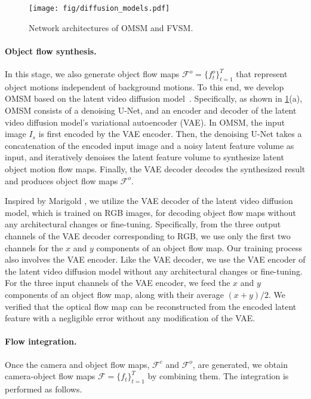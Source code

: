 \begin{figure}[t!]
\centering
\texttt{[image: fig/diffusion\_models.pdf]}
\vspace{-3mm}
\caption{
Network architectures of OMSM and FVSM.
}
\vspace{-4mm}
\label{fig:diffusion_models}
\end{figure}



\paragraph{Object flow synthesis.}
In this stage, we also generate object flow maps $\mathcal{F}^o=\{f_t^o\}_{t=1}^T$ that represent object motions independent of background motions.
To this end, we develop OMSM based on the latent video diffusion model~\cite{blattmann2023stable}.
Specifically, as shown in \cref{fig:diffusion_models}(a), OMSM consists of a denoising U-Net, and an encoder and decoder of the latent video diffusion model's variational autoencoder (VAE).
In OMSM, the input image $I_s$ is first encoded by the VAE encoder.
Then, the denoising U-Net takes a concatenation of the encoded input image and a noisy latent feature volume as input, and iteratively denoises the latent feature volume to synthesize latent object motion flow maps.
Finally, the VAE decoder decodes the synthesized result and produces object flow maps $\mathcal{F}^o$. 

Inspired by Marigold \cite{ke2024repurposing}, we utilize the VAE decoder of the latent video diffusion model, which is trained on RGB images, for decoding object flow maps without any architectural changes or fine-tuning. Specifically, from the three output channels of the VAE decoder corresponding to RGB, we use only the first two channels for the $x$ and $y$ components of an object flow map.
Our training process also involves the VAE encoder.
Like the VAE decoder, we use the VAE encoder of the latent video diffusion model without any architectural changes or fine-tuning. For the three input channels of the VAE encoder, we feed the $x$ and $y$ components of an object flow map, along with their average $(x+y)/2$.
We verified that the optical flow map can be reconstructed from the encoded latent feature with a negligible error without any modification of the VAE.


\paragraph{Flow integration.}
Once the camera and object flow maps, $\mathcal{F}^c$ and $\mathcal{F}^o$, are generated, we obtain camera-object flow maps $\mathcal{F}=\{f_t\}_{t=1}^T$ by combining them.
The integration is performed as follows.

